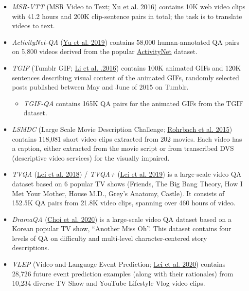 \begin{itemize}
\tightlist
\item
  \emph{MSR-VTT} (MSR Video to Text; \href{https://www.microsoft.com/en-us/research/wp-content/uploads/2016/06/cvpr16.msr-vtt.tmei_-1.pdf}{Xu et al. 2016}) contains 10K web video clips with 41.2 hours and 200K clip-sentence pairs in total; the task is to translate videos to text.
\item
  \emph{ActivityNet-QA} (\href{https://arxiv.org/abs/1906.02467}{Yu et al. 2019}) contains 58,000 human-annotated QA pairs on 5,800 videos derived from the popular \href{http://activity-net.org/index.html}{ActivityNet} dataset.
\item
  \emph{TGIF} (Tumblr GIF; \href{https://arxiv.org/abs/1604.02748}{Li et al. .2016}) contains 100K animated GIFs and 120K sentences describing visual content of the animated GIFs, randomly selected posts published between May and June of 2015 on Tumblr.

  \begin{itemize}
  \tightlist
  \item
    \emph{TGIF-QA} contains 165K QA pairs for the animated GIFs from the TGIF dataset.
  \end{itemize}
\item
  \emph{LSMDC} (Large Scale Movie Description Challenge; \href{https://arxiv.org/abs/1501.02530}{Rohrbach et al. 2015}) contains 118,081 short video clips extracted from 202 movies. Each video has a caption, either extracted from the movie script or from transcribed DVS (descriptive video services) for the visually impaired.
\item
  \emph{TVQA} (\href{https://arxiv.org/abs/1809.01696}{Lei et al. 2018}) / \emph{TVQA+} (\href{https://arxiv.org/abs/1904.11574}{Lei et al. 2019}) is a large-scale video QA dataset based on 6 popular TV shows (Friends, The Big Bang Theory, How I Met Your Mother, House M.D., Grey's Anatomy, Castle). It consists of 152.5K QA pairs from 21.8K video clips, spanning over 460 hours of video.
\item
  \emph{DramaQA} (\href{https://arxiv.org/abs/2005.03356}{Choi et al. 2020}) is a large-scale video QA dataset based on a Korean popular TV show, ``Another Miss Oh''. This dataset contains four levels of QA on difficulty and multi-level character-centered story descriptions.
\item
  \emph{VLEP} (Video-and-Language Event Prediction; \href{https://arxiv.org/abs/2010.07999}{Lei et al. 2020}) contains 28,726 future event prediction examples (along with their rationales) from 10,234 diverse TV Show and YouTube Lifestyle Vlog video clips.
\end{itemize}

